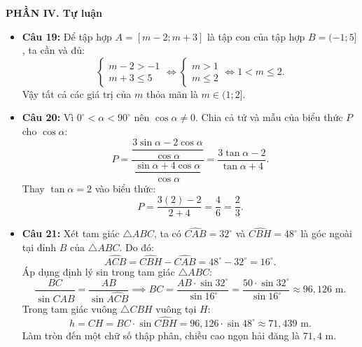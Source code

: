 \documentclass[12pt,a4paper]{article}
\begin{document}
\vspace{0.2cm}
\textbf{PHẦN IV. Tự luận}
\begin{itemize}[leftmargin=0.6cm, itemsep=4pt]
    \item \textbf{Câu 19:}
    Để tập hợp $A = [m - 2; m + 3]$ là tập con của tập hợp $B = (-1; 5]$, ta cần và đủ:
    \[
    \begin{cases}
    m - 2 > -1 \\
    m + 3 \le 5
    \end{cases}
    \iff
    \begin{cases}
    m > 1 \\
    m \le 2
    \end{cases}
    \iff 1 < m \le 2.
    \]
    Vậy tất cả các giá trị của $m$ thỏa mãn là $m \in (1; 2]$.

    \item \textbf{Câu 20:}
    Vì $0^\circ < \alpha < 90^\circ$ nên $\cos \alpha \ne 0$. Chia cả tử và mẫu của biểu thức $P$ cho $\cos \alpha$:
    \[
    P = \dfrac{\dfrac{3\sin \alpha - 2\cos \alpha}{\cos \alpha}}{\dfrac{\sin \alpha + 4\cos \alpha}{\cos \alpha}} = \dfrac{3\tan \alpha - 2}{\tan \alpha + 4}.
    \]
    Thay $\tan \alpha = 2$ vào biểu thức:
    \[
    P = \dfrac{3(2) - 2}{2 + 4} = \dfrac{4}{6} = \dfrac{2}{3}.
    \]

    \item \textbf{Câu 21:}
    Xét tam giác $\triangle ABC$, ta có $\widehat{CAB} = 32^\circ$ và $\widehat{CBH} = 48^\circ$ là góc ngoài tại đỉnh $B$ của $\triangle ABC$.
    Do đó:
    \[
    \widehat{ACB} = \widehat{CBH} - \widehat{CAB} = 48^\circ - 32^\circ = 16^\circ.
    \]
    Áp dụng định lý sin trong tam giác $\triangle ABC$:
    \[
    \dfrac{BC}{\sin \widehat{CAB}} = \dfrac{AB}{\sin \widehat{ACB}} \implies BC = \dfrac{AB \cdot \sin 32^\circ}{\sin 16^\circ} = \dfrac{50 \cdot \sin 32^\circ}{\sin 16^\circ} \approx 96{,}126\text{ m}.
    \]
    Trong tam giác vuông $\triangle CBH$ vuông tại $H$:
    \[
    h = CH = BC \cdot \sin \widehat{CBH} = 96{,}126 \cdot \sin 48^\circ \approx 71{,}439\text{ m}.
    \]
    Làm tròn đến một chữ số thập phân, chiều cao ngọn hải đăng là $71{,}4\text{ m}$.


\end{itemize}
\end{document}
